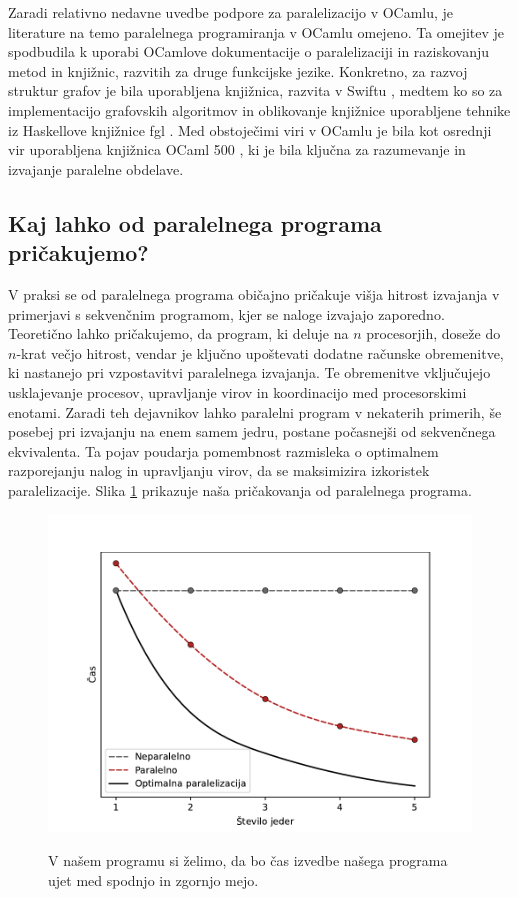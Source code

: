 \documentclass[mat1, tisk]{fmfdelo}
\begin{document}
Zaradi relativno nedavne uvedbe podpore za paralelizacijo v OCamlu, je literature na temo paralelnega programiranja v OCamlu
omejeno. Ta omejitev je spodbudila k uporabi OCamlove dokumentacije o paralelizaciji \cite{ocaml_paralelisation_documentation}
in raziskovanju metod in knjižnic, razvitih za druge funkcijske jezike. Konkretno, za razvoj struktur grafov je bila uporabljena knjižnica,
razvita v Swiftu \cite{functional_swift_graph}, medtem ko so za implementacijo grafovskih algoritmov in oblikovanje knjižnice uporabljene
tehnike iz Haskellove knjižnice fgl \cite{haskell_fgl}. Med obstoječimi viri v OCamlu je bila kot osrednji vir uporabljena knjižnica
OCaml 500 \cite{ocaml_multicore_500}, ki je bila ključna za razumevanje in izvajanje paralelne obdelave.

\subsection{Kaj lahko od paralelnega programa pričakujemo?}

V praksi se od paralelnega programa običajno pričakuje višja hitrost izvajanja v primerjavi s sekvenčnim programom,
kjer se naloge izvajajo zaporedno. Teoretično lahko pričakujemo, da program, ki deluje na $n$ procesorjih,
doseže do $n$-krat večjo hitrost, vendar je ključno upoštevati dodatne računske obremenitve, ki nastanejo pri vzpostavitvi
paralelnega izvajanja. Te obremenitve vključujejo usklajevanje procesov, upravljanje virov in koordinacijo med procesorskimi enotami.
Zaradi teh dejavnikov lahko paralelni program v nekaterih primerih, še posebej pri izvajanju na enem samem jedru,
postane počasnejši od sekvenčnega ekvivalenta. Ta pojav poudarja pomembnost razmisleka o optimalnem razporejanju
nalog in upravljanju virov, da se maksimizira izkoristek paralelizacije. Slika \ref{fig:cilj-casovne-zahtevnosti-paralelizacije} prikazuje
naša pričakovanja od paralelnega programa.

\begin{figure}[h!]
  \centering
  \caption{V našem programu si želimo, da bo čas izvedbe našega programa ujet med spodnjo in zgornjo mejo.}
  \includegraphics[width=13cm]{slike/cilj-casovne-zahtevnosti-paralelizacije.pdf}
  \label{fig:cilj-casovne-zahtevnosti-paralelizacije}
\end{figure}
\end{document}
